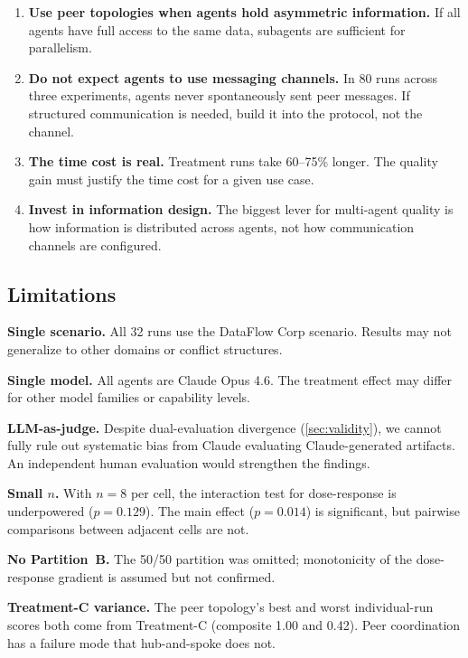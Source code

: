 \documentclass[11pt,letterpaper]{article}
\newcommand{\pval}[1]{\ensuremath{p = #1}}
\begin{document}
\begin{enumerate}
  \item \textbf{Use peer topologies when agents hold asymmetric
    information.} If all agents have full access to the same data,
    subagents are sufficient for parallelism.
  \item \textbf{Do not expect agents to use messaging channels.} In
    80 runs across three experiments, agents never spontaneously sent
    peer messages. If structured communication is needed, build it into
    the protocol, not the channel.
  \item \textbf{The time cost is real.} Treatment runs take 60--75\%
    longer. The quality gain must justify the time cost for a given
    use case.
  \item \textbf{Invest in information design.} The biggest lever for
    multi-agent quality is how information is distributed across agents,
    not how communication channels are configured.
\end{enumerate}

\subsection{Limitations}

\textbf{Single scenario.} All 32 runs use the DataFlow Corp scenario.
Results may not generalize to other domains or conflict structures.

\textbf{Single model.} All agents are Claude Opus 4.6. The treatment
effect may differ for other model families or capability levels.

\textbf{LLM-as-judge.} Despite dual-evaluation divergence (\cref{sec:validity}),
we cannot fully rule out systematic bias from Claude evaluating
Claude-generated artifacts. An independent human evaluation would
strengthen the findings.

\textbf{Small $n$.} With $n = 8$ per cell, the interaction test for
dose-response is underpowered (\pval{0.129}). The main effect
(\pval{0.014}) is significant, but pairwise comparisons between
adjacent cells are not.

\textbf{No Partition~B.} The 50/50 partition was omitted; monotonicity
of the dose-response gradient is assumed but not confirmed.

\textbf{Treatment-C variance.} The peer topology's best and worst
individual-run scores both come from Treatment-C (composite 1.00
and 0.42). Peer coordination has a failure mode that hub-and-spoke
does not.
\end{document}
